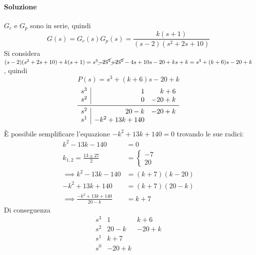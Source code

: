 \paragraph{Soluzione}
\(G_c\) e \(G_p\) sono in serie, quindi
\[
	G(s) = G_c(s)G_p(s) = \frac{k(s+1)}{(s-2)(s^2 + 2s + 10)}
\]
Si considera \((s-2)(s^2+2s+10)+k(s+1) = s^3 \cancel{-2s^2} \cancel{+2s^2} -4s +10s -20 +ks +k = s^3 +(k+6)s -20+k\),
quindi \[P(s) = s^3 +(k+6)s -20+k\]
\[\begin{array}{r|rr}
	s^3 & 1 & k+6 \\
	s^2 & 0 & -20+k \\
	\midrule
	s^2 & 20-k & -20+k \\
	s^1 & -k^2+13k+140
\end{array}\]
È possibile semplificare l'equazione \(-k^2 +13k +140 = 0\) trovando le sue radici:
\begin{align*}
	k^2 -13k -140 &= 0 \\
	k_{1,2} = \frac{13 \pm27}{2} &= \begin{cases} -7 \\ 20 \end{cases} \\
	\implies k^2 -13k -140 &= (k +7) (k -20) \\
	-k^2 +13k +140 &= (k +7) (20 -k) \\
	\implies \frac{-k^2 +13k +140}{20 -k} &= k+7
\end{align*}
Di conseguenza
\[\begin{array}{r|rr}
	s^3 &    1 &   k+6 \\
	s^2 & 20-k & -20+k \\
	s^1 &  k+7 	   \\
	s^0 & -20+k
\end{array}\]
